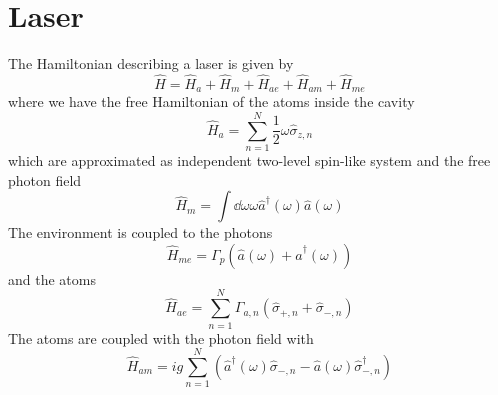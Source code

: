\section{Laser}

The Hamiltonian describing a laser is given by
\begin{equation}
	\hat{H}
	=
	\hat{H}_a
	+
	\hat{H}_m
	+
	\hat{H}_{ae}
	+
	\hat{H}_{am}
	+
	\hat{H}_{me}
\end{equation}
where we have the free Hamiltonian of the atoms inside the cavity
\begin{equation}
	\hat{H}_a
	=
	\sum_{n=1}^N
	\frac{1}{2}
	\omega
	\hat\sigma_{z,n}
\end{equation}
which are approximated as independent two-level spin-like system and the free photon field
\begin{equation}
	\hat{H}_m
	=
	\int\dd{\omega}
	\omega
	\hat{a}^\dagger(\omega)
	\hat{a}(\omega)
\end{equation}
The environment is coupled to the photons
\begin{equation}
	\hat{H}_{me}
	=
	\Gamma_p
	\left(
		\hat{a}(\omega)
		+
		\hat{a}^\dagger(\omega)
	\right)
\end{equation}
and the atoms
\begin{equation}
	\hat{H}_{ae}
	=
	\sum_{n=1}^N
	\Gamma_{a,n}
	\left(
		\hat\sigma_{+,n}
		+
		\hat\sigma_{-,n}
	\right)
\end{equation}
The atoms are coupled with the photon field with
\begin{equation}
	\hat{H}_{am}
	=
	ig
	\sum_{n=1}^N
	\left(
		\hat{a}^\dagger(\omega)
		\hat\sigma_{-,n}
		-
		\hat{a}(\omega)
		\hat\sigma_{-,n}^\dagger
	\right)
\end{equation}